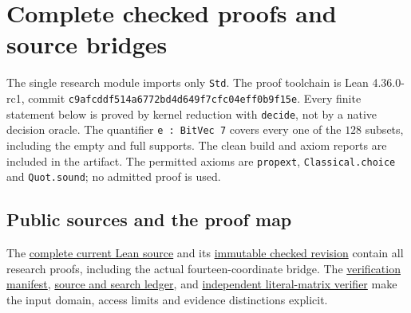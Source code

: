 \section{Complete checked proofs and source bridges}\label{app:lean}
The single research module imports only \texttt{Std}. The proof toolchain is
Lean 4.36.0-rc1, commit \texttt{c9afcddf514a6772bd4d649f7cfc04eff0b9f15e}.
Every finite statement below is proved by kernel reduction with
\texttt{decide}, not by a native decision oracle. The quantifier
\texttt{e : BitVec 7} covers every one of the $128$ subsets, including the
empty and full supports. The clean build and axiom reports are included
in the artifact. The permitted axioms are \texttt{propext},
\texttt{Classical.choice} and \texttt{Quot.sound}; no admitted proof is used.

\subsection{Public sources and the proof map}
The \href{https://github.com/alectionary/vibe-math/blob/master/formalization/gallager-b-absorbing/Counterexample.lean}{complete current Lean source}
and its
\href{https://github.com/alectionary/vibe-math/blob/2717b0ab2b59c2ccb71f0e369a9f21d80490c191/formalization/gallager-b-absorbing/Counterexample.lean}{immutable checked revision}
contain all research proofs, including the actual fourteen-coordinate bridge.
The
\href{https://github.com/alectionary/vibe-math/blob/master/formalization/gallager-b-absorbing/verification.json}{verification manifest},
\href{https://github.com/alectionary/vibe-math/blob/master/formalization/gallager-b-absorbing/prior-art.json}{source and search ledger}, and
\href{https://github.com/alectionary/vibe-math/blob/master/formalization/gallager-b-absorbing/verify.py}{independent literal-matrix verifier}
make the input domain, access limits and evidence distinctions explicit.

